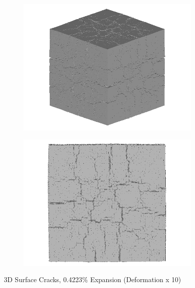   \begin{figure}[ht!]
  \centering
      \begin{subfigure}{.5\textwidth}
        \centering
        \includegraphics[width=.8\linewidth]{Files/exp_3D/DEF/A30X0C_3_3d.png}
      \end{subfigure}%
      \begin{subfigure}{.5\textwidth}
        \centering
        \includegraphics[width=.8\linewidth]{Files/exp_3D/DEF/A30X0C_3_3ds.png}
        \end{subfigure}
    \caption{3D Surface Cracks, 0.4223\% Expansion (Deformation x 10)}
    \label{fig:DEF_A30X0C_3_3D}
  \end{figure}

